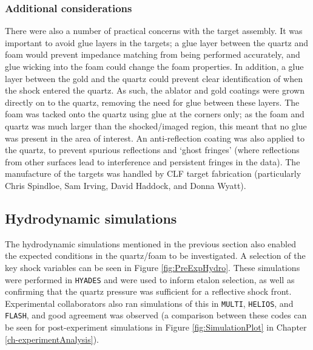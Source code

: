 \subsubsection{Additional considerations}

There were also a number of practical concerns with the target assembly. It was important to avoid glue layers in the targets; a glue layer between the quartz and foam would prevent impedance matching from being performed accurately, and glue wicking into the foam could change the foam properties. In addition, a glue layer between the gold and the quartz could prevent clear identification of when the shock entered the quartz. As such, the ablator and gold coatings were grown directly on to the quartz, removing the need for glue between these layers. The foam was tacked onto the quartz using glue at the corners only; as the foam and quartz was much larger than the shocked/imaged region, this meant that no glue was present in the area of interest. An anti-reflection coating was also applied to the quartz, to prevent spurious reflections and `ghost fringes' (where reflections from other surfaces lead to interference and persistent fringes in the data). The manufacture of the targets was handled by CLF target fabrication (particularly Chris Spindloe, Sam Irving, David Haddock, and Donna Wyatt). 

\subsection{Hydrodynamic simulations}

The hydrodynamic simulations mentioned in the previous section also enabled the expected conditions in the quartz/foam to be investigated. A selection of the key shock variables can be seen in Figure \ref{fig:PreExpHydro}. These simulations were performed in \texttt{HYADES} and were used to inform etalon selection, as well as confirming that the quartz pressure was sufficient for a reflective shock front. Experimental collaborators also ran simulations of this in \texttt{MULTI}, \texttt{HELIOS}, and \texttt{FLASH}, and good agreement was observed (a comparison between these codes can be seen for post-experiment simulations in Figure \ref{fig:SimulationPlot} in Chapter \ref{ch-experimentAnalysis}).

